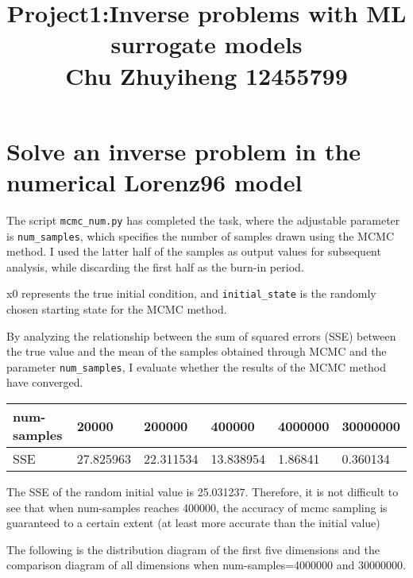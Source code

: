 \documentclass[11pt,reqno]{amsart}
\begin{document}
\title[]{Project1:Inverse problems with ML surrogate models\\Chu Zhuyiheng 12455799}
\maketitle


\section{Solve an inverse problem in the numerical Lorenz96 model}

The script \verb|mcmc_num.py| has completed the task, where the adjustable parameter is \verb|num_samples|, which specifies the number of samples drawn using the MCMC method. I used the latter half of the samples as output values for subsequent analysis, while discarding the first half as the burn-in period.

x0 represents the true initial condition, and \verb|initial_state| is the randomly chosen starting state for the MCMC method.

By analyzing the relationship between the sum of squared errors (SSE) between the true value and the mean of the samples obtained through MCMC and the parameter \verb|num_samples|, I evaluate whether the results of the MCMC method have converged.

\begin{table}[H]
  \begin{tabular}{|l|l|l|l|l|l|}
  \hline
  num-samples & 20000            & 200000            & 400000             & 4000000             & 30000000            \\ \hline
  SSE         & 27.825963 & 22.311534 & 13.838954 & 1.86841 & 0.360134 \\ \hline
  \end{tabular}
\end{table}

The SSE of the random initial value is 25.031237. Therefore, it is not difficult to see that when num-samples reaches 400000, the accuracy of mcmc sampling is guaranteed to a certain extent (at least more accurate than the initial value)

The following is the distribution diagram of the first five dimensions and the comparison diagram of all dimensions when num-samples=4000000 and 30000000.
\end{document}

